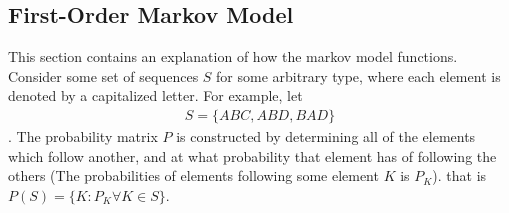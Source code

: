 \subsection{First-Order Markov Model}

This section contains an explanation of how the markov model functions. Consider some set of sequences $S$ for some arbitrary type, where each element is denoted by a capitalized letter. For example, let 
\begin{align}
	S=\{ABC, ABD, BAD\} \label{example-first-order-markov-sequence-small}
\end{align}. 
The probability matrix $P$ is constructed by determining all of the elements which follow another, and at what probability that element has of following the others (The probabilities of elements following some element $K$ is $P_K$). that is $P(S) = \{K:P_K \forall K \in S\}$.

